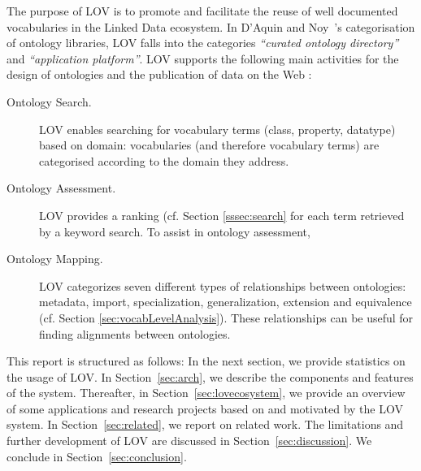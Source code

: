 \documentclass{iosart2c}
\begin{document}
The purpose of LOV is to promote and facilitate the reuse of well documented vocabularies in the Linked Data ecosystem. In D'Aquin and Noy~\cite{AquinJoWS12}'s categorisation of ontology libraries, LOV falls into the categories \textit{``curated ontology directory''}  and \textit{``application platform''}.  LOV supports the following main activities for the design of ontologies and the publication of data on the Web \cite{MC10, ohdeploying, pedrinaci2014, villata2012}:

\begin{description}
 \item [Ontology Search.] LOV enables searching for vocabulary terms (class, property, datatype) based on domain: vocabularies (and therefore vocabulary terms) are categorised according to the domain they address.
 \item [Ontology Assessment.] LOV provides a ranking (cf. Section \ref{sssec:search} for each term retrieved by a keyword search. To assist in ontology assessment, 
 \item [Ontology Mapping.] LOV categorizes seven different types of relationships between ontologies: metadata, import, specialization, generalization, extension and equivalence (cf. Section \ref{sec:vocabLevelAnalysis}). These relationships can be useful for finding alignments between ontologies. 
\end{description}

This report is structured as follows: In the next section, we provide statistics on the usage of LOV. In Section~\ref{sec:arch}, we describe the components and features of the system. Thereafter, in Section~\ref{sec:lovecosystem}, we provide an overview of some applications and research projects based on and motivated by the LOV system. In Section~\ref{sec:related}, we report on related work. The limitations and further development of LOV are discussed in Section~\ref{sec:discussion}. We conclude in Section~\ref{sec:conclusion}.


\end{document}

